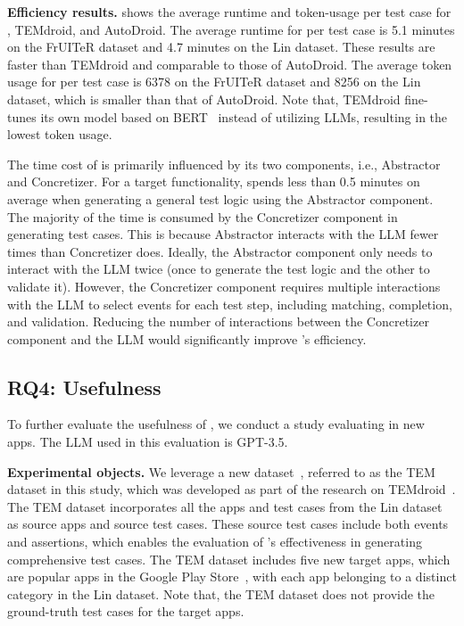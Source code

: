\textbf{Efficiency results.}
 shows the average runtime and token-usage per test case for \toolNameSmall{}, TEMdroid, and AutoDroid. The average runtime for \toolNameSmall{} per test case is 5.1 minutes on the FrUITeR dataset and 4.7 minutes on the Lin dataset. These results are faster than TEMdroid and comparable to those of AutoDroid.
The average token usage for \toolNameSmall{} per test case is 6378 on the FrUITeR dataset and 8256 on the Lin dataset, which is smaller than that of AutoDroid. Note that, TEMdroid fine-tunes its own model based on BERT~\cite{bert-implement} instead of utilizing LLMs, resulting in the lowest token usage.


The time cost of \toolNameSmall{} is primarily influenced by its two components, i.e., Abstractor and Concretizer. 
For a target functionality, \toolNameSmall{} spends less than 0.5 minutes on average when generating a general test logic using the Abstractor component. The majority of the time is consumed by the Concretizer component in generating test cases. This is because Abstractor interacts with the LLM fewer times than Concretizer does. Ideally, the Abstractor component only needs to interact with the LLM twice (once to generate the test logic and the other to validate it). However, the Concretizer component requires multiple interactions with the LLM to select events for each test step, including matching, completion, and validation. Reducing the number of interactions between the Concretizer component and the LLM would significantly improve \toolNameSmall{}'s efficiency.








\subsection{RQ4: Usefulness}
To further evaluate the usefulness of \toolNameSmall{}, we conduct a study evaluating \toolNameSmall{} in new apps. The LLM used in this evaluation is GPT-3.5.

\textbf{Experimental objects.} 
We leverage a new dataset~\cite{TEMdroid-dataset}, referred to as the TEM dataset in this study, which was developed as part of the research on TEMdroid~\cite{zhang2024learning}. The TEM dataset incorporates all the apps and test cases from the Lin dataset~\cite{craftdroid-dataset} as source apps and source test cases.  
These source test cases include both events and assertions, which enables the evaluation of \toolNameSmall{}'s effectiveness in generating comprehensive test cases.
The TEM dataset includes five new target apps, which are popular apps in the Google Play Store~\cite{google-play}, with each app belonging to a distinct category in the Lin dataset. Note that, the TEM dataset does not provide the ground-truth test cases for the target apps.

